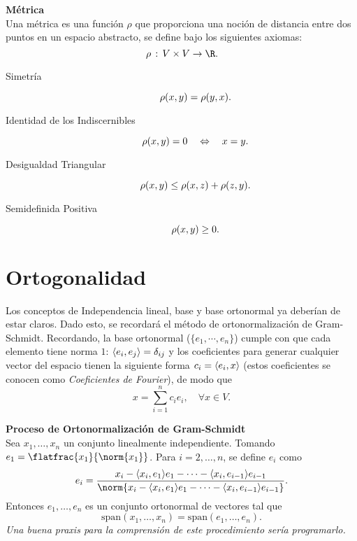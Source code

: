 \begin{mdframed}[style=warning]
	{\large \textbf{Métrica}} \\
	Una métrica es una función $\rho$ que proporciona una noción de distancia entre dos puntos en un espacio abstracto, se define bajo los siguientes axiomas:
	$$ \rho \, : \, V\times V \to \R. $$
	\begin{description}
		\item[Simetría]
			$$ \rho(x,y) = \rho(y,x). $$
		\item[Identidad de los Indiscernibles]
			$$ \rho(x,y) = 0 \quad \Leftrightarrow \quad x = y. $$
		\item[Desigualdad Triangular]
			$$ \rho(x,y) \leq \rho(x,z) + \rho(z,y). $$
		\item[Semidefinida Positiva]
			$$ \rho(x,y) \geq 0. $$
	\end{description}
\end{mdframed}



\section*{Ortogonalidad}

Los conceptos de Independencia lineal, base y base ortonormal ya deberían de estar claros. Dado esto, se recordará el método de ortonormalización de Gram-Schmidt. Recordando, la base ortonormal ($\{ e_1 ,\cdots , e_n \}$) cumple con que cada elemento tiene norma $1$: $\langle e_i , e_j \rangle = \delta _{ij}$ y los coeficientes para generar cualquier vector del espacio tienen la siguiente forma $c_i = \langle e_i , x \rangle$ (estos coeficientes se conocen como \textit{Coeficientes de Fourier}), de modo que
	$$ x = \sum _{i = 1} ^n c_i e_i, \quad \forall x \in V. $$
	


\begin{mdframed}[style=warning]
	{\large \textbf{Proceso de Ortonormalización de Gram-Schmidt}} \\
	Sea $x_1 , \ldots , x_n$ un conjunto linealmente independiente. Tomando $e_1 = \flatfrac{x_1}{\norm{x_1}}$. Para $i = 2,\ldots ,n$, se define $e_i$ como
		$$ e_i = \frac{ x_i - \inner{x_i}{e_1} e_1 - \cdots - \inner{x_i}{e_{i - 1}} e_{i - 1} }{ \norm{ x_i - \inner{x_i}{e_1} e_1 - \cdots - \inner{x_i}{e_{i - 1}} e_{i - 1} } }. $$
	Entonces $e_1 ,\ldots ,e_n$ es un conjunto ortonormal de vectores tal que
		$$ \text{span} (x_1 , \ldots , x_n) = \text{span} (e_1 ,\ldots ,e_n). $$
	\textit{Una buena praxis para la comprensión de este procedimiento sería programarlo.}
\end{mdframed}



